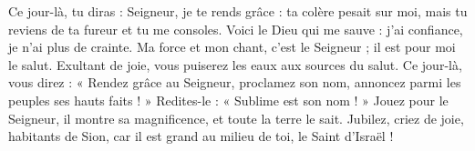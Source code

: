 Ce jour-là, tu diras : Seigneur, je te rends grâce : ta colère pesait sur moi, mais tu reviens de ta fureur et tu me consoles.
\versseparator
Voici le Dieu qui me sauve : j’ai confiance, je n’ai plus de crainte. Ma force et mon chant, c’est le Seigneur ; il est pour moi le salut.
\versseparator
Exultant de joie, vous puiserez les eaux aux sources du salut.
\versseparator
Ce jour-là, vous direz : « Rendez grâce au Seigneur, proclamez son nom, annoncez parmi les peuples ses hauts faits ! » Redites-le : « Sublime est son nom ! »
\versseparator
Jouez pour le Seigneur, il montre sa magnificence, et toute la terre le sait.
\versseparator
Jubilez, criez de joie, habitants de Sion, car il est grand au milieu de toi, le Saint d’Israël !
